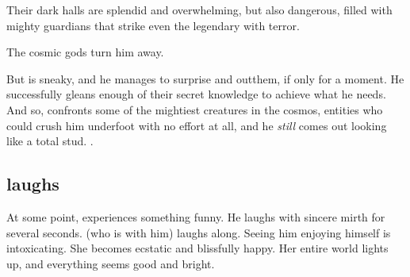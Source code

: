 Their dark halls are splendid and overwhelming, but also dangerous, filled with mighty guardians that strike even the legendary \Ishnaruchaefir{} with terror. 


The cosmic gods turn him away. 


But \Ishnaruchaefir{} is sneaky, and he manages to surprise and out\manoeuvre them, if only for a moment. He successfully gleans enough of their secret knowledge to achieve what he needs. And so, \Ishnaruchaefir{} confronts some of the mightiest creatures in the cosmos, entities who could crush him underfoot with no effort at all, and he \emph{still} comes out looking like a total stud. .  







\subsection{\Ishnaruchaefir{} laughs}
At some point, \Ishnaruchaefir{} experiences something funny. 
He laughs with sincere mirth for several seconds. 
\Criseis{} (who is with him) laughs along. 
Seeing him enjoying himself is intoxicating. 
She becomes ecstatic and blissfully happy. 
Her entire world lights up, and everything seems good and bright. 

